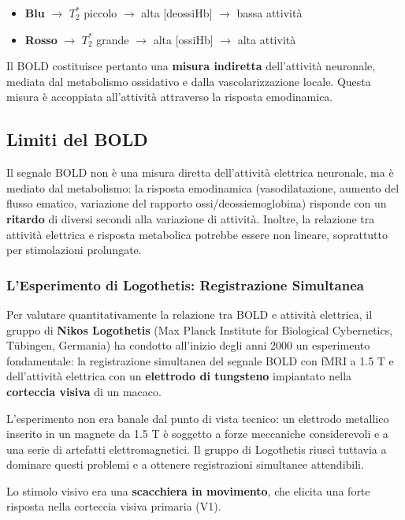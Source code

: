 \begin{itemize}
    \item \textbf{Blu} $\rightarrow$ $T_2^*$ piccolo $\rightarrow$ alta [deossiHb] $\rightarrow$ bassa attività
    \item \textbf{Rosso} $\rightarrow$ $T_2^*$ grande $\rightarrow$ alta [ossiHb] $\rightarrow$ alta attività
\end{itemize}

Il BOLD costituisce pertanto una \textbf{misura indiretta} dell'attività neuronale, mediata dal metabolismo ossidativo e dalla vascolarizzazione locale. Questa misura è accoppiata all'attività attraverso la risposta emodinamica.



\subsection{Limiti del BOLD}

Il segnale BOLD non è una misura diretta dell'attività elettrica neuronale, ma è mediato dal metabolismo: la risposta emodinamica (vasodilatazione, aumento del flusso ematico, variazione del rapporto ossi/deossiemoglobina) risponde con un \textbf{ritardo} di diversi secondi alla variazione di attività. Inoltre, la relazione tra attività elettrica e risposta metabolica potrebbe essere non lineare, soprattutto per stimolazioni prolungate.

\subsubsection{L'Esperimento di Logothetis: Registrazione Simultanea}

Per valutare quantitativamente la relazione tra BOLD e attività elettrica, il gruppo di \textbf{Nikos Logothetis} (Max Planck Institute for Biological Cybernetics, Tübingen, Germania) ha condotto all'inizio degli anni 2000 un esperimento fondamentale: la registrazione simultanea del segnale BOLD con fMRI a 1.5 T e dell'attività elettrica con un \textbf{elettrodo di tungsteno} impiantato nella \textbf{corteccia visiva} di un macaco.

L'esperimento non era banale dal punto di vista tecnico: un elettrodo metallico inserito in un magnete da 1.5 T è soggetto a forze meccaniche considerevoli e a una serie di artefatti elettromagnetici. Il gruppo di Logothetis riuscì tuttavia a dominare questi problemi e a ottenere registrazioni simultanee attendibili.

Lo stimolo visivo era una \textbf{scacchiera in movimento}, che elicita una forte risposta nella corteccia visiva primaria (V1).

